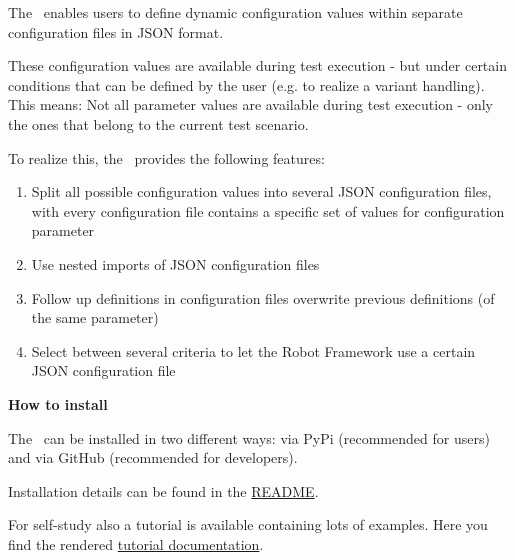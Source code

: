 %



%

The \pkg\ enables users to define dynamic configuration values within separate configuration files in JSON format.

These configuration values are available during test execution - but under certain conditions that can be defined by the user
(e.g. to realize a variant handling). This means: Not all parameter values are available during test execution - only the ones
that belong to the current test scenario.

To realize this, the \pkg\ provides the following features:

\begin{enumerate}
   \item Split all possible configuration values into several JSON configuration files, with every configuration file contains a specific
         set of values for configuration parameter
   \item Use nested imports of JSON configuration files
   \item Follow up definitions in configuration files overwrite previous definitions (of the same parameter)
   \item Select between several criteria to let the Robot Framework use a certain JSON configuration file
\end{enumerate}

\vspace{2ex}

\textbf{How to install}

\vspace{2ex}

The \pkg\ can be installed in two different ways: via PyPi (recommended for users) and via GitHub (recommended for developers).

Installation details can be found in the \href{https://github.com/test-fullautomation/robotframework-testsuitesmanagement/blob/develop/README.rst}{README}.

For self-study also a tutorial is available containing lots of examples.
Here you find the rendered \href{https://htmlpreview.github.io/?https://github.com/test-fullautomation/robotframework-tutorial/blob/develop/900_building_testsuites/building_testsuites.html}{tutorial documentation}.

